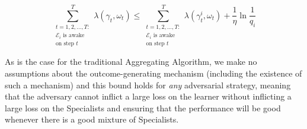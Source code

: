 \begin{equation}
    \overset{T}{\underset{\substack{t=1,2,\ldots,T:\\\mathcal{E}_i\text{ is awake}\\\text{on step }t}}{\sum}}\lambda(\gamma_t, \omega_t) \leq \overset{T}{\underset{\substack{t=1,2,\ldots,T:\\\mathcal{E}_i\text{ is awake}\\\text{on step }t}}{\sum}} \lambda(\gamma^i_t, \omega_t) + \frac{1}{\eta}\ln\frac{1}{q_i}
\end{equation}

As is the case for the traditional Aggregating Algorithm, we make no assumptions about the outcome-generating mechanism (including the existence of such a mechanism) and this bound holds for \textit{any} adversarial strategy, meaning that the adversary cannot inflict a large loss on the learner without inflicting a large loss on the Specialists and ensuring that the performance will be good whenever there is a good mixture of Specialists.